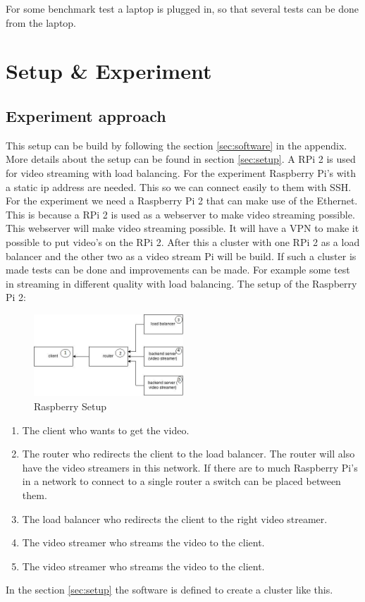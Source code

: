 \documentclass{sig-alternate-br}
\begin{document}
For some benchmark test a laptop is plugged in, so that several tests can be done from the laptop.


\section{Setup \& Experiment}


\subsection{Experiment approach}
This setup can be build by following the section \ref{sec:software} in the appendix. More details about the setup can be found in section \ref{sec:setup}. A RPi 2 is used for video streaming with load balancing. For the experiment Raspberry Pi's with a static ip address are needed. This so we can connect easily to them with SSH.  For the experiment we need a Raspberry Pi 2 that can make use of the Ethernet. This is because a RPi 2 is used as a webserver to make video streaming possible. This webserver will make video streaming possible. It will have a VPN to make it possible to put video's on the RPi 2. 
After this a cluster with one RPi 2 as a load balancer and the other two as a video stream Pi will be build. If such a cluster is made tests can be done and improvements can be made. For example some test in streaming in different quality with load balancing. The setup of the Raspberry Pi 2:

\begin{figure}[H]
	\centering 
	\includegraphics[width=0.5\textwidth]{raspsetup.jpg}
	\caption{Raspberry Setup}
	\label{fig:setup} %
\end{figure}
\begin{enumerate}[topsep=0pt,itemsep=-1ex,partopsep=1ex,parsep=1ex] 
\item The client who wants to get the video. 
\item The router who redirects the client to the load balancer. The router will also have the video streamers in this network. If there are to much Raspberry Pi's in a network to connect to a single router a switch can be placed between them. 
\item The load balancer who redirects the client to the right video streamer.
\item The video streamer who streams the video to the client.
\item The video streamer who streams the video to the client.
\end{enumerate}
In the section \ref{sec:setup} the software is defined to create a cluster like this.
\end{document}
